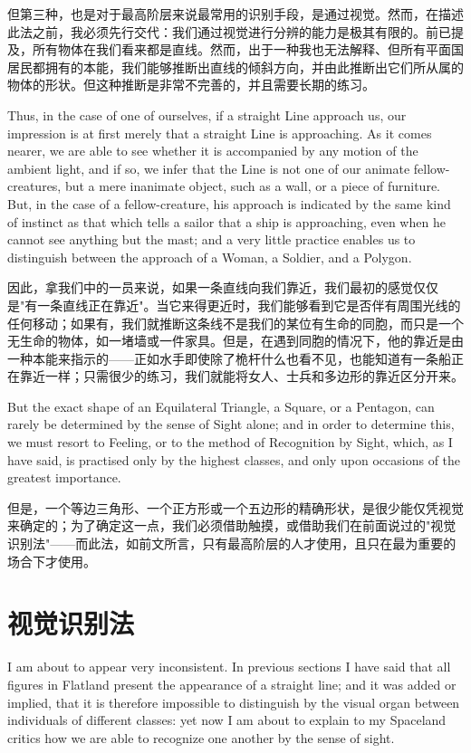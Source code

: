 \documentclass[12pt,UTF8]{ctexbook}
\begin{document}
但第三种，也是对于最高阶层来说最常用的识别手段，是通过视觉。然而，在描述此法之前，我必须先行交代：我们通过视觉进行分辨的能力是极其有限的。前已提及，所有物体在我们看来都是直线。然而，出于一种我也无法解释、但所有平面国居民都拥有的本能，我们能够推断出直线的倾斜方向，并由此推断出它们所从属的物体的形状。但这种推断是非常不完善的，并且需要长期的练习。

Thus, in the case of one of ourselves, if a straight Line approach us, our impression is at first merely that a straight Line is approaching. As it comes nearer, we are able to see whether it is accompanied by any motion of the ambient light, and if so, we infer that the Line is not one of our animate fellow-creatures, but a mere inanimate object, such as a wall, or a piece of furniture. But, in the case of a fellow-creature, his approach is indicated by the same kind of instinct as that which tells a sailor that a ship is approaching, even when he cannot see anything but the mast; and a very little practice enables us to distinguish between the approach of a Woman, a Soldier, and a Polygon.

因此，拿我们中的一员来说，如果一条直线向我们靠近，我们最初的感觉仅仅是"有一条直线正在靠近"。当它来得更近时，我们能够看到它是否伴有周围光线的任何移动；如果有，我们就推断这条线不是我们的某位有生命的同胞，而只是一个无生命的物体，如一堵墙或一件家具。但是，在遇到同胞的情况下，他的靠近是由一种本能来指示的——正如水手即使除了桅杆什么也看不见，也能知道有一条船正在靠近一样；只需很少的练习，我们就能将女人、士兵和多边形的靠近区分开来。

But the exact shape of an Equilateral Triangle, a Square, or a Pentagon, can rarely be determined by the sense of Sight alone; and in order to determine this, we must resort to Feeling, or to the method of Recognition by Sight, which, as I have said, is practised only by the highest classes, and only upon occasions of the greatest importance.

但是，一个等边三角形、一个正方形或一个五边形的精确形状，是很少能仅凭视觉来确定的；为了确定这一点，我们必须借助触摸，或借助我们在前面说过的"视觉识别法"——而此法，如前文所言，只有最高阶层的人才使用，且只在最为重要的场合下才使用。

\chapter{视觉识别法}

I am about to appear very inconsistent. In previous sections I have said that all figures in Flatland present the appearance of a straight line; and it was added or implied, that it is therefore impossible to distinguish by the visual organ between individuals of different classes: yet now I am about to explain to my Spaceland critics how we are able to recognize one another by the sense of sight.
\end{document}

